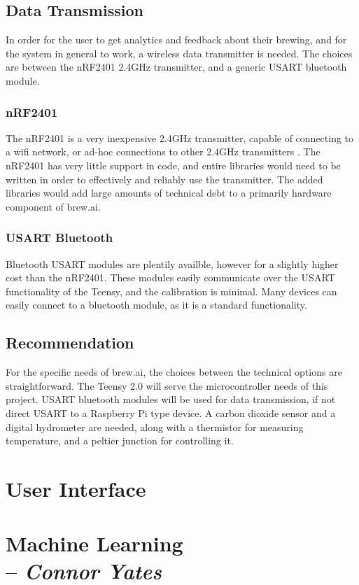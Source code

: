 \documentclass[draftclsnofoot,onecolumn,letterpaper,10pt]{IEEEtran}
\begin{document}
\subsection{Data Transmission}
In order for the user to get analytics and feedback about their brewing, and for the system in general to work, a wireless data transmitter is needed.
The choices are between the nRF2401 2.4GHz transmitter, and a generic USART bluetooth module.
\subsubsection{nRF2401}
The nRF2401 is a very inexpensive 2.4GHz transmitter, capable of connecting to a wifi network, or ad-hoc connections to other 2.4GHz 
	transmitters \cite{nrf}.
The nRF2401 has very little support in code, and entire libraries would need to be written in order to effectively and reliably use the transmitter.
The added libraries would add large amounts of technical debt to a primarily hardware component of brew.ai.
\subsubsection{USART Bluetooth}
Bluetooth USART modules are plentily availble, however for a slightly higher cost than the nRF2401.
These modules easily communicate over the USART functionality of the Teensy, and the calibration is minimal.
Many devices can easily connect to a bluetooth module, as it is a standard functionality.

\subsection{Recommendation}
For the specific needs of brew.ai, the choices between the technical options are straightforward.
The Teensy 2.0 will serve the microcontroller needs of this project.
USART bluetooth modules will be used for data transmission, if not direct USART to a Raspberry Pi type device.
A carbon dioxide sensor and a digital hydrometer are needed, along with a thermistor for measuring temperature, and a peltier junction for controlling it.

\section{User Interface}

\section{Machine Learning \\ -- \textbf{\textit{Connor Yates}}}
\end{document}
